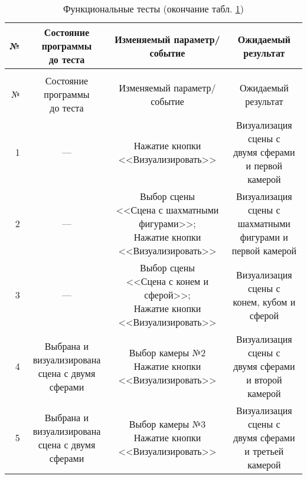 	
\begin{longtable}{|r|c|c|c|}
	\caption{\label{tab:func}Функциональные тесты (начало)} \\ \hline
	№ & \makecell{Состояние программы \\ до теста} & Изменяемый параметр/событие & Ожидаемый результат \\ \hline
	\endfirsthead
	\caption[]{Функциональные тесты (окончание табл. \ref{tab:func})} \\ \hline
	№ & \makecell{Состояние программы \\ до теста} & Изменяемый параметр/событие & Ожидаемый результат \\ \hline
	\endhead
	\hline
	\endfoot
	\hline
	\endlastfoot
	
	1 & --- & \makecell{Нажатие кнопки\\<<Визуализировать>>} & \makecell{Визуализация сцены с \\двумя сферами и первой\\камерой} \\ \hline
	2 & --- & \makecell{Выбор сцены \\<<Сцена с шахматными \\фигурами>>;\\Нажатие кнопки\\<<Визуализировать>>} & \makecell{Визуализация сцены с \\шахматными фигурами и\\ первой камерой} \\ \hline
	3 & --- & \makecell{Выбор сцены \\<<Сцена с конем и сферой>>;\\Нажатие кнопки\\<<Визуализировать>>} & \makecell{Визуализация сцены с \\конем, кубом и сферой} \\ \hline
	4 & \makecell{Выбрана и\\визуализирована\\сцена с двумя сферами} & \makecell{Выбор камеры №2\\Нажатие кнопки\\<<Визуализировать>>} & \makecell{Визуализация сцены с \\двумя сферами и второй\\камерой} \\ \hline
	5 & \makecell{Выбрана и\\визуализирована\\сцена с двумя сферами} & \makecell{Выбор камеры №3\\Нажатие кнопки\\<<Визуализировать>>} & \makecell{Визуализация сцены с \\двумя сферами и третьей\\камерой} \\ \hline

\end{longtable}
